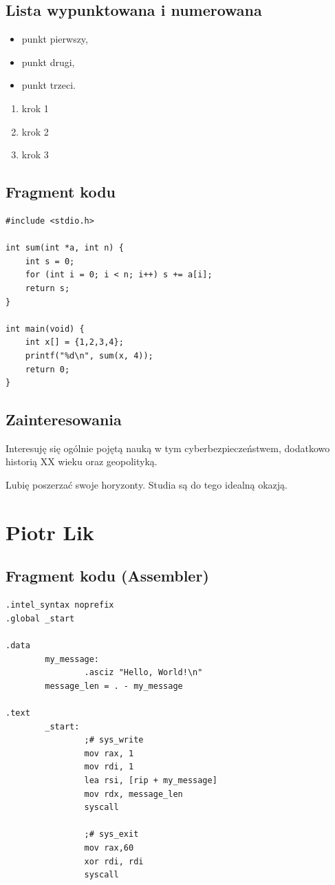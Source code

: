 \documentclass[12pt,a4paper]{article}
\begin{document}
\subsection{Lista wypunktowana i numerowana}
\begin{itemize}
  \item punkt pierwszy,
  \item punkt drugi,
  \item punkt trzeci.
\end{itemize}

\begin{enumerate}
  \item krok 1
  \item krok 2
  \item krok 3
\end{enumerate}

\subsection{Fragment kodu}
\begin{lstlisting}
#include <stdio.h>

int sum(int *a, int n) {
    int s = 0;
    for (int i = 0; i < n; i++) s += a[i];
    return s;
}

int main(void) {
    int x[] = {1,2,3,4};
    printf("%d\n", sum(x, 4));
    return 0;
}
\end{lstlisting}

\subsection{Zainteresowania}

\hspace{0.65cm}Interesuję się ogólnie pojętą nauką w tym cyberbezpieczeństwem, dodatkowo historią XX wieku oraz geopolityką.

Lubię poszerzać swoje horyzonty. Studia są do tego idealną okazją.


\section{Piotr Lik}

\subsection{Fragment kodu (Assembler)}
\begin{lstlisting}
.intel_syntax noprefix
.global _start

.data
        my_message:
                .asciz "Hello, World!\n"
        message_len = . - my_message

.text
        _start:
                ;# sys_write
                mov rax, 1
                mov rdi, 1
                lea rsi, [rip + my_message]
                mov rdx, message_len
                syscall

                ;# sys_exit
                mov rax,60
                xor rdi, rdi
                syscall
\end{lstlisting}
\end{document}
